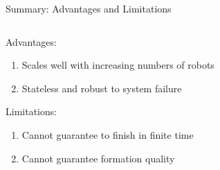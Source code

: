 \begin{frame}{Summary: Advantages and Limitations}
    \begin{columns}[T] %
     \begin{column}{.4\textwidth}
        Advantages:
            \begin{enumerate}
            \item Scales well with increasing numbers of robots
            \item Stateless and robust to system failure
            \end{enumerate}
        Limitations:
            \begin{enumerate}
            \item Cannot guarantee to finish in finite time 
            \item Cannot guarantee formation quality 
            \end{enumerate}
     \end{column}%
     \begin{column}{.5\textwidth}
        
     \end{column}%
   \end{columns}

\end{frame}